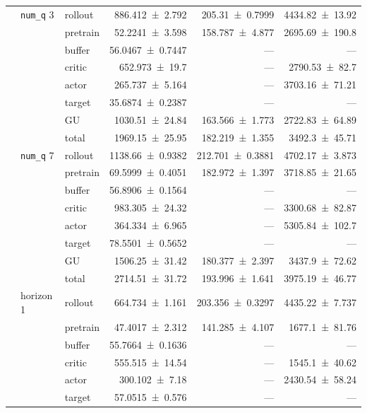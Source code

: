 {\begin{longtable}{@{}lllrrr@{}}
    \addlinespace[2pt]
     & \texttt{num\_\allowbreak q} 3 & rollout & \num{886.412+-2.792} & \num{205.31+-0.7999} & \num{4434.82+-13.92} \\
     &  & pretrain & \num{52.2241+-3.598} & \num{158.787+-4.877} & \num{2695.69+-190.8} \\
     &  & buffer & \num{56.0467+-0.7447} & --- & --- \\
     &  & critic & \num{652.973+-19.7} & --- & \num{2790.53+-82.7} \\
     &  & actor & \num{265.737+-5.164} & --- & \num{3703.16+-71.21} \\
     &  & target & \num{35.6874+-0.2387} & --- & --- \\
     &  & GU & \num{1030.51+-24.84} & \num{163.566+-1.773} & \num{2722.83+-64.89} \\
     &  & total & \num{1969.15+-25.95} & \num{182.219+-1.355} & \num{3492.3+-45.71} \\
    \addlinespace[2pt]
     & \texttt{num\_\allowbreak q} 7 & rollout & \num{1138.66+-0.9382} & \num{212.701+-0.3881} & \num{4702.17+-3.873} \\
     &  & pretrain & \num{69.5999+-0.4051} & \num{182.972+-1.397} & \num{3718.85+-21.65} \\
     &  & buffer & \num{56.8906+-0.1564} & --- & --- \\
     &  & critic & \num{983.305+-24.32} & --- & \num{3300.68+-82.87} \\
     &  & actor & \num{364.334+-6.965} & --- & \num{5305.84+-102.7} \\
     &  & target & \num{78.5501+-0.5652} & --- & --- \\
     &  & GU & \num{1506.25+-31.42} & \num{180.377+-2.397} & \num{3437.9+-72.62} \\
     &  & total & \num{2714.51+-31.72} & \num{193.996+-1.641} & \num{3975.19+-46.77} \\
    \addlinespace[2pt]
     & horizon 1 & rollout & \num{664.734+-1.161} & \num{203.356+-0.3297} & \num{4435.22+-7.737} \\
     &  & pretrain & \num{47.4017+-2.312} & \num{141.285+-4.107} & \num{1677.1+-81.76} \\
     &  & buffer & \num{55.7664+-0.1636} & --- & --- \\
     &  & critic & \num{555.515+-14.54} & --- & \num{1545.1+-40.62} \\
     &  & actor & \num{300.102+-7.18} & --- & \num{2430.54+-58.24} \\
     &  & target & \num{57.0515+-0.576} & --- & --- \\

\end{longtable}}
